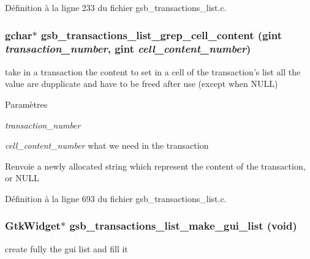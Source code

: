 Définition à la ligne 233 du fichier gsb\_\-transactions\_\-list.c.

\subsubsection[{gsb\_\-transactions\_\-list\_\-grep\_\-cell\_\-content}]{\setlength{\rightskip}{0pt plus 5cm}gchar$\ast$ gsb\_\-transactions\_\-list\_\-grep\_\-cell\_\-content (gint {\em transaction\_\-number}, \/  gint {\em cell\_\-content\_\-number})}\label{gsb__transactions__list_8h_a1e229d05133af4abe35b72675491f580}
take in a transaction the content to set in a cell of the transaction's list all the value are dupplicate and have to be freed after use (except when NULL)


\begin{DoxyParams}{Paramètres}
\item[{\em transaction\_\-number}]\item[{\em cell\_\-content\_\-number}]what we need in the transaction\end{DoxyParams}
\begin{DoxyReturn}{Renvoie}
a newly allocated string which represent the content of the transaction, or NULL 
\end{DoxyReturn}


Définition à la ligne 693 du fichier gsb\_\-transactions\_\-list.c.

\subsubsection[{gsb\_\-transactions\_\-list\_\-make\_\-gui\_\-list}]{\setlength{\rightskip}{0pt plus 5cm}GtkWidget$\ast$ gsb\_\-transactions\_\-list\_\-make\_\-gui\_\-list (void)}\label{gsb__transactions__list_8h_a5a3574009546c888666713aa8269327b}
create fully the gui list and fill it


